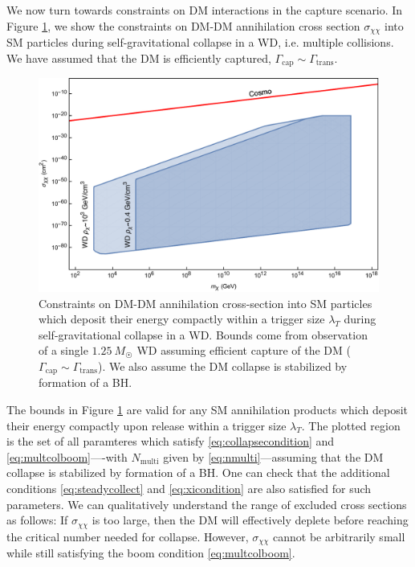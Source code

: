 \documentclass[preprintnumbers,amsmath,amssymb,prd,superscriptaddress]{revtex4}
\begin{document}
We now turn towards constraints on DM interactions in the capture scenario. 
In Figure \ref{fig:multicapture}, we show the constraints on DM-DM annihilation cross section $\sigma_{\chi \chi}$ into SM particles during self-gravitational collapse in a WD, i.e. multiple collisions.
We have assumed that the DM is efficiently captured, $\Gamma_\text{cap} \sim \Gamma_\text{trans}$. 
\begin{figure}
\includegraphics[scale=.35]{multicollision.pdf}
\caption{Constraints on DM-DM annihilation cross-section into SM particles which deposit their energy compactly within a trigger size $\lambda_T$ during self-gravitational collapse in a WD. Bounds come from observation of a single $1.25~M_{\astrosun}$ WD assuming efficient capture of the DM ($\Gamma_\text{cap} \sim \Gamma_\text{trans}$). We also assume the DM collapse is stabilized by formation of a BH.}
\label{fig:multicapture}
\end{figure}
The bounds in Figure \ref{fig:multicapture} are valid for any SM annihilation products which deposit their energy compactly upon release within a trigger size $\lambda_T$.
The plotted region is the set of all paramteres which satisfy \eqref{eq:collapsecondition} and \eqref{eq:multcolboom}----with $N_\text{multi}$ given by \eqref{eq:nmulti}---assuming that the DM collapse is stabilized by formation of a BH. 
One can check that the additional conditions \eqref{eq:steadycollect} and \eqref{eq:xicondition} are also satisfied for such parameters. 
We can qualitatively understand the range of excluded cross sections as follows:
If $\sigma_{\chi \chi}$ is too large, then the DM will effectively deplete before reaching the critical number needed for collapse.
However, $\sigma_{\chi \chi}$ cannot be arbitrarily small while still satisfying the boom condition \eqref{eq:multcolboom}. 
\end{document}
